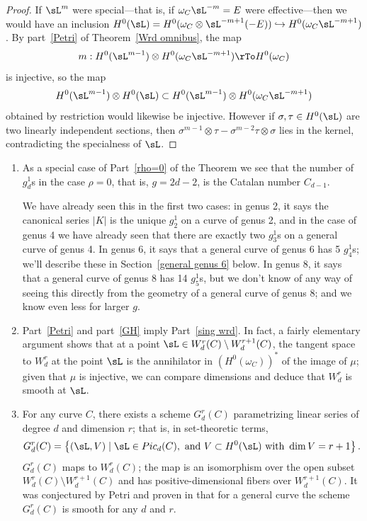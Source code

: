 \begin{proof}
If $\sL^m$ were special---that is, if $\omega_C\sL^{-m} = E$ were effective---then we would have an inclusion $H^0(\sL) = H^0(\omega_C\otimes \sL^{-m+1}(-E)) \hookrightarrow H^0(\omega_C\sL^{-m+1})$. By part~\ref{Petri} of Theorem~\ref{Wrd omnibus}, the map 
 $$
m : H^0(\sL^{m-1}) \otimes H^0(\omega_C\sL^{-m+1}) \rTo H^0(\omega_C)
$$
is injective, so the map
$$
H^0(\sL^{m-1}) \otimes H^0(\sL) \subset H^0(\sL^{m-1}) \otimes H^0(\omega_C\sL^{-m+1})
$$
obtained by restriction would likewise be injective.
However if $\sigma, \tau \in H^0(\sL)$ are two linearly independent sections, then $\sigma^{m-1} \otimes \tau - \sigma^{m-2}\tau \otimes \sigma$ lies in the kernel, contradicting the specialness of $\sL$.
\end{proof}

\begin{remark}

\begin{enumerate}
 \item As a special case of Part~\ref{rho=0} of the Theorem we see that the number of $g^{1}_{d}$s
 in the case $\rho=0$, that is, $g=2d-2$, is the Catalan number $C_{d-1}$.

We have already seen this in the first two cases: in genus 2, it says the canonical series $|K|$ is the unique $g^1_2$ on a curve of genus 2, and in the case of genus 4 we have already seen  that there are exactly two $g^1_3$s on a general curve of genus 4. In genus 6, it says that a general curve of genus 6 has 5 $g^1_4$s; we'll describe these in Section~\ref{general genus 6} below.  In genus 8, it says that a general curve of genus 8 has 14 $g^1_5$s, but we don't know of any way of seeing this directly from the geometry of a general curve of genus 8; and we know even less for larger $g$.

\item Part~\ref{Petri} and part~\ref{GH} imply Part~\ref{sing wrd}. In fact, a fairly elementary argument  shows that at a point $\sL  \in W^r_d(C) \setminus W^{r+1}_d(C)$, the tangent space to $W^r_d$ at the point $\sL $ is the annihilator
in $(H^0(\omega_C))^*$ of the image of $\mu$; given that $\mu$ is injective, we can compare dimensions and deduce that $W^r_d$ is smooth at $\sL $.

\item For any curve $C$, there exists a scheme $G^r_d(C)$ parametrizing linear series of degree $d$ and dimension $r$; that is, in set-theoretic terms,
$$
G^r_d(C) = \left\{ (\sL , V) \mid \sL  \in Pic_d(C), \text{ and } V \subset H^0(\sL ) \text{ with } \dim V = r+1 \right\}.
$$
$G^r_d(C)$ maps to $W^r_d(C)$; the map is an isomorphism over the open subset $W^r_d(C) \setminus W^{r+1}_d(C)$ and has positive-dimensional fibers over $W^{r+1}_d(C)$. It was conjectured
by Petri and proven in \cite{Gieseker-Petri} that for a general curve the scheme $G^r_d(C)$ is smooth for any $d$ and $r$.
\end{enumerate}
\end{remark}



